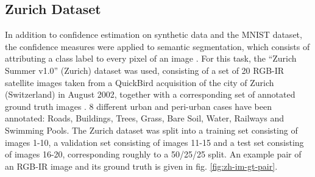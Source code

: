 \documentclass[10pt]{article}
\begin{document}
\subsection{Zurich Dataset}
\label{subsec:data-zurich}
In addition to confidence estimation on synthetic data and the \gls{MNIST} dataset, the confidence measures were applied to semantic segmentation, which consists of attributing a class label to every pixel of an image \cite{Volpi2017DenseSL}. For this task, the ``Zurich Summer v1.0'' (Zurich) dataset was used, consisting of a set of 20 RGB-IR satellite images taken from a QuickBird acquisition of the city of Zurich (Switzerland) in August 2002, together with a corresponding set of annotated ground truth images \cite{Volpi2015SemanticSO}. 8 different urban and peri-urban cases have been annotated: Roads, Buildings, Trees, Grass, Bare Soil, Water, Railways and Swimming Pools. The Zurich dataset was split into a training set consisting of images 1-10, a validation set consisting of images 11-15 and a test set consisting of images 16-20, corresponding roughly to a 50/25/25 split. An example pair of an RGB-IR image and its ground truth is given in fig. \ref{fig:zh-im-gt-pair}.
\end{document}
